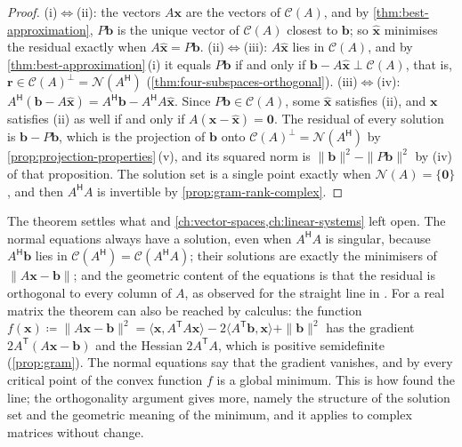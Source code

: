 \begin{proof}
(i)$\Leftrightarrow$(ii): the vectors $A\mathbf x$ are the vectors of $\mathcal C(A)$, and by \cref{thm:best-approximation}, $P\mathbf b$ is the unique vector of $\mathcal C(A)$ closest to $\mathbf b$; so $\hat{\mathbf x}$ minimises the residual exactly when $A\hat{\mathbf x}=P\mathbf b$. (ii)$\Leftrightarrow$(iii): $A\hat{\mathbf x}$ lies in $\mathcal C(A)$, and by \cref{thm:best-approximation}\,(i) it equals $P\mathbf b$ if and only if $\mathbf b-A\hat{\mathbf x}\perp\mathcal C(A)$, that is, $\mathbf r\in\mathcal C(A)^\perp=\mathcal N(A^{\mathsf H})$ (\cref{thm:four-subspaces-orthogonal}). (iii)$\Leftrightarrow$(iv): $A^{\mathsf H}(\mathbf b-A\hat{\mathbf x})=A^{\mathsf H}\mathbf b-A^{\mathsf H}A\hat{\mathbf x}$. Since $P\mathbf b\in\mathcal C(A)$, some $\hat{\mathbf x}$ satisfies (ii), and $\mathbf x$ satisfies (ii) as well if and only if $A(\mathbf x-\hat{\mathbf x})=\mathbf 0$. The residual of every solution is $\mathbf b-P\mathbf b$, which is the projection of $\mathbf b$ onto $\mathcal C(A)^\perp=\mathcal N(A^{\mathsf H})$ by \cref{prop:projection-properties}\,(v), and its squared norm is $\|\mathbf b\|^2-\|P\mathbf b\|^2$ by (iv) of that proposition. The solution set is a single point exactly when $\mathcal N(A)=\{\mathbf 0\}$, and then $A^{\mathsf H}A$ is invertible by \cref{prop:gram-rank-complex}.
\end{proof}

The theorem settles what  and \cref{ch:vector-spaces,ch:linear-systems} left open. The normal equations always have a solution, even when $A^{\mathsf H}A$ is singular, because $A^{\mathsf H}\mathbf b$ lies in $\mathcal C(A^{\mathsf H})=\mathcal C(A^{\mathsf H}A)$; their solutions are exactly the minimisers of $\|A\mathbf x-\mathbf b\|$; and the geometric content of the equations is that the residual is orthogonal to every column of $A$, as observed for the straight line in . For a real matrix the theorem can also be reached by calculus: the function $f(\mathbf x)\coloneqq\|A\mathbf x-\mathbf b\|^2=\langle\mathbf x,A^{\mathsf T}A\mathbf x\rangle-2\langle A^{\mathsf T}\mathbf b,\mathbf x\rangle+\|\mathbf b\|^2$ has the gradient $2A^{\mathsf T}(A\mathbf x-\mathbf b)$ and the Hessian $2A^{\mathsf T}A$, which is positive semidefinite (\cref{prop:gram}). The normal equations say that the gradient vanishes, and by  every critical point of the convex function $f$ is a global minimum. This is how  found the line; the orthogonality argument gives more, namely the structure of the solution set and the geometric meaning of the minimum, and it applies to complex matrices without change.

